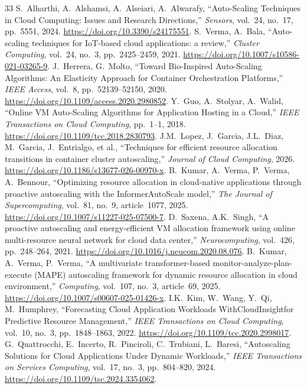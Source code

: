 \documentclass[10pt,twocolumn,a4paper]{article}
\begin{document}
\begin{thebibliography}{33}
 S.~Alharthi, A.~Alshamsi, A.~Alseiari, A.~Alwarafy, ``Auto-Scaling Techniques in Cloud Computing: Issues and Research Directions,'' \emph{Sensors}, vol.~24, no.~17, pp.~5551, 2024. \url{https://doi.org/10.3390/s24175551}.
 S.~Verma, A.~Bala, ``Auto-scaling techniques for IoT-based cloud applications: a review,'' \emph{Cluster Computing}, vol.~24, no.~3, pp.~2425--2459, 2021. \url{https://doi.org/10.1007/s10586-021-03265-9}.
 J.~Herrera, G.~Molto, ``Toward Bio-Inspired Auto-Scaling Algorithms: An Elasticity Approach for Container Orchestration Platforms,'' \emph{IEEE Access}, vol.~8, pp.~52139--52150, 2020. \url{https://doi.org/10.1109/access.2020.2980852}.
 Y.~Guo, A.~Stolyar, A.~Walid, ``Online VM Auto-Scaling Algorithms for Application Hosting in a Cloud,'' \emph{IEEE Transactions on Cloud Computing}, pp.~1--1, 2018. \url{https://doi.org/10.1109/tcc.2018.2830793}.
 J.M.~Lopez, J.~Garcia, J.L.~Diaz, M.~Garcia, J.~Entrialgo, et al., ``Techniques for efficient resource allocation transitions in container cluster autoscaling,'' \emph{Journal of Cloud Computing}, 2026. \url{https://doi.org/10.1186/s13677-026-00970-x}.
 B.~Kumar, A.~Verma, P.~Verma, A.~Bennour, ``Optimizing resource allocation in cloud-native applications through proactive autoscaling with the InformerAutoScale model,'' \emph{The Journal of Supercomputing}, vol.~81, no.~9, article~1077, 2025. \url{https://doi.org/10.1007/s11227-025-07500-7}.
 D.~Saxena, A.K.~Singh, ``A proactive autoscaling and energy-efficient VM allocation framework using online multi-resource neural network for cloud data center,'' \emph{Neurocomputing}, vol.~426, pp.~248--264, 2021. \url{https://doi.org/10.1016/j.neucom.2020.08.076}.
 B.~Kumar, A.~Verma, P.~Verma, ``A multivariate transformer-based monitor-analyze-plan-execute (MAPE) autoscaling framework for dynamic resource allocation in cloud environment,'' \emph{Computing}, vol.~107, no.~3, article~69, 2025. \url{https://doi.org/10.1007/s00607-025-01426-x}.
 I.K.~Kim, W.~Wang, Y.~Qi, M.~Humphrey, ``Forecasting Cloud Application Workloads WithCloudInsightfor Predictive Resource Management,'' \emph{IEEE Transactions on Cloud Computing}, vol.~10, no.~3, pp.~1848--1863, 2022. \url{https://doi.org/10.1109/tcc.2020.2998017}.
 G.~Quattrocchi, E.~Incerto, R.~Pinciroli, C.~Trubiani, L.~Baresi, ``Autoscaling Solutions for Cloud Applications Under Dynamic Workloads,'' \emph{IEEE Transactions on Services Computing}, vol.~17, no.~3, pp.~804--820, 2024. \url{https://doi.org/10.1109/tsc.2024.3354062}.

\end{thebibliography}
\end{document}
